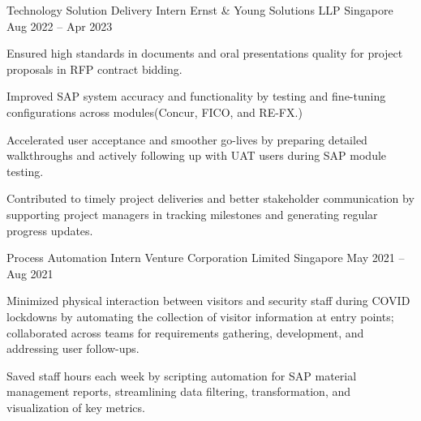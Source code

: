 

\begin{cventries}

  \cventry
  {Technology Solution Delivery Intern} %
  {Ernst \& Young Solutions LLP} %
  {Singapore} %
  {Aug 2022 – Apr 2023} %
  {
    \begin{cvitems} %
      \item {Ensured high standards in documents and oral presentations quality for project proposals in RFP contract bidding.}
      \item {Improved SAP system accuracy and functionality by testing and fine-tuning configurations across modules(Concur, FICO, and RE-FX.)}
      \item {Accelerated user acceptance and smoother go-lives by preparing detailed walkthroughs and actively following up with UAT users during SAP module testing.}
      \item {Contributed to timely project deliveries and better stakeholder communication by supporting project managers in tracking milestones and generating regular progress updates.}
      \vspace{3mm}
    \end{cvitems}
  }

  \cventry
  {Process Automation Intern} %
  {Venture Corporation Limited} %
  {Singapore} %
  {May 2021 – Aug 2021} %
  {
    \begin{cvitems} %
      \item {Minimized physical interaction between visitors and security staff during COVID lockdowns by automating the collection of visitor information at entry points; collaborated across teams for requirements gathering, development, and addressing user follow-ups.}
      \item {Saved staff hours each week by scripting automation for SAP material management reports, streamlining data filtering, transformation, and visualization of key metrics.}
      \vspace{3mm}
    \end{cvitems}
  }


\end{cventries}
